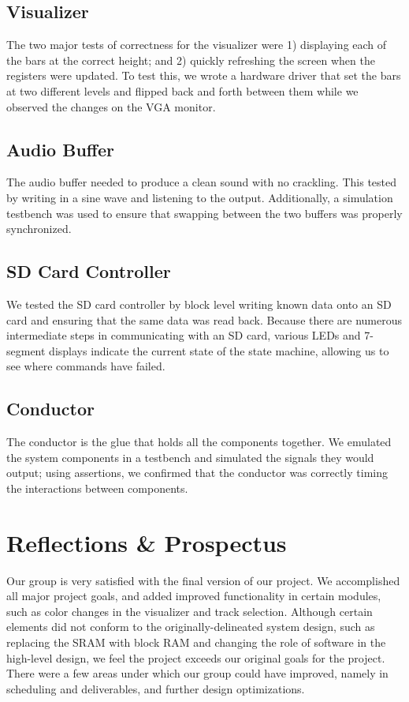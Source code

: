 \documentclass{article}
\begin{document}
\subsection{Visualizer}

The two major tests of correctness for the visualizer were 1) displaying each
of the bars at the correct height; and 2) quickly refreshing the screen when
the registers were updated. To test this, we wrote a hardware driver that set
the bars at two different levels and flipped back and forth between them while
we observed the changes on the VGA monitor.

\subsection{Audio Buffer}

The audio buffer needed to produce a clean sound with no crackling. This tested
by writing in a sine wave and listening to the output. Additionally, a
simulation testbench was used to ensure that swapping between the two buffers
was properly synchronized.

\subsection{SD Card Controller}

We tested the SD card controller by block level writing known data onto an SD
card and ensuring that the same data was read back. Because there are numerous
intermediate steps in communicating with an SD card, various LEDs and 7-segment
displays indicate the current state of the state machine, allowing us to see
where commands have failed.

\subsection{Conductor}

The conductor is the glue that holds all the components together. We emulated
the system components in a testbench and simulated the signals they would
output; using assertions, we confirmed that the conductor was correctly timing
the interactions between components.

\section{Reflections \& Prospectus}

Our group is very satisfied with the final version of our project. We accomplished all 
major project goals, and added improved functionality in certain modules, such as 
color changes in the visualizer and track selection. Although certain elements did not 
conform to the originally-delineated system design, such as replacing the SRAM with 
block RAM and changing the role of software in the high-level design, we feel the 
project exceeds our original goals for the project. There were a few areas under 
which our group could have improved, namely in scheduling and deliverables, and 
further design optimizations.
\end{document}
